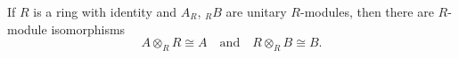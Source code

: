If $R$ is a ring with identity and $A_R$, ${}_R B$ are unitary $R$-modules, then there are $R$-module isomorphisms
\[
A \otimes_R R \cong A \quad \text{and} \quad R \otimes_R B \cong B.
\]